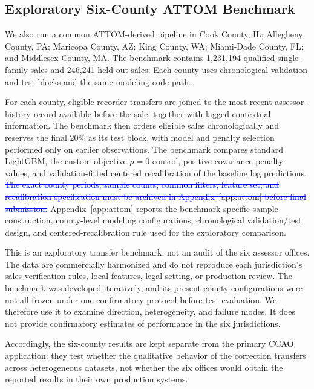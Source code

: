\documentclass[10pt]{article}
\theoremstyle{definition}
\newcommand{\1}{\mathbf{1}}
\newcommand{\oldtext}[1]{\textcolor{blue}{\sout{#1}}}
\newcommand{\newtext}[1]{\textcolor{impGreen}{#1}}
\begin{document}
\subsection{Exploratory Six-County ATTOM Benchmark}
\label{subsec:attom_design}

We also run a common ATTOM-derived pipeline in Cook County, IL; Allegheny County, PA; Maricopa County, AZ; King County, WA; Miami-Dade County, FL; and Middlesex County, MA. The benchmark contains 1,231,194 qualified single-family sales and 246,241 held-out sales. Each county uses chronological validation and test blocks and the same modeling code path.

\textcolor{impGreen}{For each county, eligible recorder transfers are joined to the most recent assessor-history record available before the sale, together with lagged contextual information. The benchmark then orders eligible sales chronologically and reserves the final 20\% as its test block, with model and penalty selection performed only on earlier observations. The benchmark compares standard LightGBM, the custom-objective $\rho=0$ control, positive covariance-penalty values, and validation-fitted centered recalibration of the baseline log predictions. \oldtext{The exact county periods, sample counts, common filters, feature set, and recalibration specification must be archived in Appendix~\ref{app:attom} before final submission.} \newtext{Appendix~\ref{app:attom} reports the benchmark-specific sample construction, county-level modeling configurations, chronological validation/test design, and centered-recalibration rule used for the exploratory comparison.}}

This is an exploratory transfer benchmark, not an audit of the six assessor offices. The data are commercially harmonized and do not reproduce each jurisdiction's sales-verification rules, local features, legal setting, or production review. The benchmark was developed iteratively, and its present county configurations were not all frozen under one confirmatory protocol before test evaluation. We therefore use it to examine direction, heterogeneity, and failure modes. It does not provide confirmatory estimates of performance in the six jurisdictions.

\textcolor{impGreen}{Accordingly, the six-county results are kept separate from the primary CCAO application: they test whether the qualitative behavior of the correction transfers across heterogeneous datasets, not whether the six offices would obtain the reported results in their own production systems.}
\end{document}
